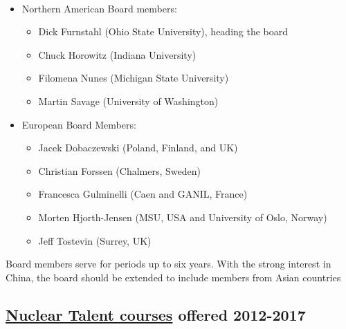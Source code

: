 \documentclass[%
oneside,                 %
final,                   %
10pt]{article}
\begin{document}
\paragraph{}
\begin{itemize}
\item Northern American Board members:
\begin{itemize}

  \item Dick Furnstahl (Ohio State University), heading the board

  \item Chuck Horowitz (Indiana University) 

  \item Filomena Nunes (Michigan State University) 

  \item Martin Savage (University of  Washington) 

\end{itemize}

\noindent
\item European Board Members:
\begin{itemize}

  \item Jacek Dobaczewski (Poland, Finland, and UK) 

  \item Christian Forssen (Chalmers, Sweden) 

  \item Francesca Gulminelli (Caen and GANIL, France) 

  \item Morten Hjorth-Jensen (MSU, USA and University of Oslo, Norway)

  \item Jeff Tostevin (Surrey, UK) 
\end{itemize}

\noindent
\end{itemize}

\noindent
Board members serve for periods up to six years. With the strong interest in China, the board should be extended to include members from Asian countries



\subsection{\href{{http://fribtheoryalliance.org/TALENT/courses/courses.php}}{Nuclear Talent courses}  offered 2012-2017}
\end{document}
